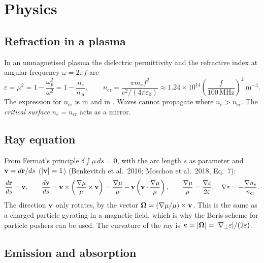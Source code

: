 \chapter{Physics}

\section{Refraction in a plasma}
In an unmagnetised plasma the dielectric permittivity and the refractive index at
angular frequency $\omega=2\pi f$ are
\begin{equation}
  \varepsilon = \mu^2 = 1-\frac{\omega_p^2}{\omega^2} = 1-\frac{n_e}{n_\text{cr}},
  \qquad
  n_\text{cr}=\frac{\pi m_e f^2}{e^2/(4\pi\varepsilon_0)}
  \approx 1.24\times10^{14}\left(\frac{f}{100\,\text{MHz}}\right)^2\ \text{m}^{-3}.
  \label{eq:ncr}
\end{equation}
The expression for $n_\text{cr}$ is  in 
and  in . Waves cannot propagate where
$n_e>n_\text{cr}$. The \emph{critical surface} $n_e=n_\text{cr}$ acts as a mirror.

\section{Ray equation}
From Fermat's principle $\delta\!\int\mu\,ds=0$, with the arc length $s$ as parameter
and $\mathbf{v}=d\mathbf{r}/ds$ ($|\mathbf{v}|=1$) (Benkevitch et al.\ 2010; Moschou et al.\
2018, Eq.~7):
\begin{equation}
  \frac{d\mathbf{r}}{ds}=\mathbf{v},\qquad
  \frac{d\mathbf{v}}{ds}=\mathbf{v}\times\left(\frac{\nabla\mu}{\mu}\times\mathbf{v}\right)
  =\frac{\nabla\mu}{\mu}-\mathbf{v}\left(\mathbf{v}\cdot\frac{\nabla\mu}{\mu}\right),
  \qquad \frac{\nabla\mu}{\mu}=\frac{\nabla\varepsilon}{2\varepsilon},\quad
  \nabla\varepsilon=-\frac{\nabla n_e}{n_\text{cr}}.
  \label{eq:ray}
\end{equation}
The direction $\mathbf{v}$ only rotates, by the vector
$\mathbf{\Omega}=(\nabla\mu/\mu)\times\mathbf{v}$. This is the same as a charged particle
gyrating in a magnetic field, which is why the Boris scheme for particle pushers can be
used. The curvature of the ray is $\kappa=|\mathbf{\Omega}|=|\nabla_\perp\varepsilon|/(2\varepsilon)$.

\section{Emission and absorption}
